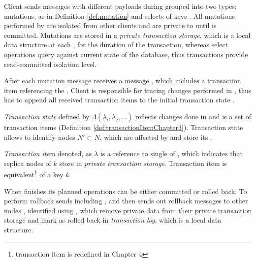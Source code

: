 Client \client sends messages with different payloads during \transaction grouped into two types: mutations, as in Definition \ref{def:mutation} and selects of keys \selectMessage. 
All mutations \mutations performed by \client are isolated from other clients and are private to \transaction until \transaction is committed. Mutations are stored in a \emph{private transaction storage}, which is a local data structure at each , for the duration of the transaction, whereas select operations query against current state of the database, thus transactions provide read-committed isolation level.

After each mutation message \client receives a message \updateTxStateMessage, which includes a transaction item \txItem referencing the . Client is responsible for tracing changes performed in \transaction, thus \client has to append all received transaction items to the initial transaction state \txState.

\begin{definition}
\label{def:transactionStateChapter3}
\emph{Transaction state} defined by $\Lambda(\lambda_{i}, \lambda_{j}, ...)$ reflects changes done in \transaction and is a set of transaction items (Definition \ref{def:transactionItemChapter3}). Transaction state allows to identify nodes $N' \subset N$, which are affected by \transaction and store its \mutations.
\end{definition}

\begin{definition}
\label{def:transactionItemChapter3}
\emph{Transaction item} denoted, as $\lambda$ is a reference to single  of \transaction, which indicates that replica nodes of $k$ store  in \emph{private transaction storage}. Transaction item is equivalent\footnote{transaction item is redefined in Chapter 4} of a key $k$.
\end{definition}


When \client finishes its planned operations \transaction can be either committed or rolled back. To perform rollback \client sends \txRollbackMessage including \txState, and then  sends out rollback messages to other nodes \rollbackMessage, identified using \txItems, which remove private data from their private transaction storage and mark \transaction as rolled back in \emph{transaction log}, which is a local data structure.

